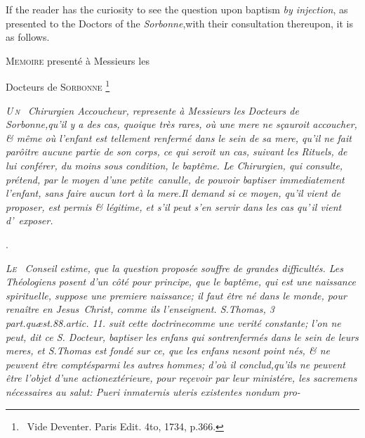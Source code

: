 \documentclass{article}
\begin{document}
\vfill

{\fontsize{8}{7}\selectfont
If the reader has
the curiosity to see the question upon baptism \textit{by injection}, as presented
to the Doctors of the \textit{Sorbonne},\tsk with their consultation thereupon, it is as
follows.}

\newpage
\centerline{\textsc{Memoire} presenté à Messieurs les}
\centerline{Docteurs de \textsc{Sorbonne} \footnote{\ Vide Deventer. Paris Edit. 4to,
1734, p.\@ 366.}}

\lettrine{\itshape U\,}{\itshape n\ }\bgroup\itshape\small\setlength{\baselineskip}{13pt}%
Chirurgien Accoucheur,
represente à Messieurs les Docteurs de
\hbox{\upshape Sorbonne},\break qu’il y a des cas, quoique
très rares, où une mere ne sçauroit accoucher, \&
même où l’enfant est tellement renfermé
dans le sein de sa mere, qu’il ne fait parôitre aucune
partie de son corps, ce qui seroit un cas, suivant les Rituels, de
lui conférer, du moins sous condition, le baptême. Le
Chirurgien, qui consulte, prétend, par le moyen
d’une \hbox{\upshape petite canulle,} de pouvoir baptiser
immediatement l’enfant, sans faire aucun tort à la
mere.\tsh  Il demand si ce moyen, qu’il vient de
proposer, est permis \& légitime, et s’il peut
s’en servir dans les cas qu’\,il vient
d’~exposer.\egroup

\newpage
\centerline{.}

\lettrine{\itshape L}{\itshape e\ }\bgroup\fontsize{9}{13}\selectfont\itshape
Conseil estime, que la question proposée souffre de
grandes difficultés. Les Théo\-logiens posent d’un côté pour principe, que
le baptême, qui est une naissance spirituelle,
suppose une premiere naissance; il faut être né
dans le monde, pour renaître en \hbox{\upshape Jesus Christ},
comme ils l’enseignent. S.\@ {\upshape Thomas, 3 part.\break quæst.\@ 88.\@ artic.\@
11.\@} suit cette doctrine\break comme une verité constante; l’on ne peut, dit ce S.
Docteur, baptiser les enfans qui sont\break renfermés dans le sein de leurs meres,
et S.\break \hbox{\upshape Thomas} est fondé sur ce, que les enfans ne\break sont
point nés, \& ne peuvent être comptés\break parmi les autres hommes; d’où il
conclud,\break qu’ils ne peuvent être l’objet d’une action\break extérieure, pour
reçevoir par leur ministére, les sacremens nécessaires au salut: 
\fontsize{10}{13}\selectfont\upshape
Pueri
in\break maternis uteris existentes nondum pro-\break
\egroup
\end{document}
